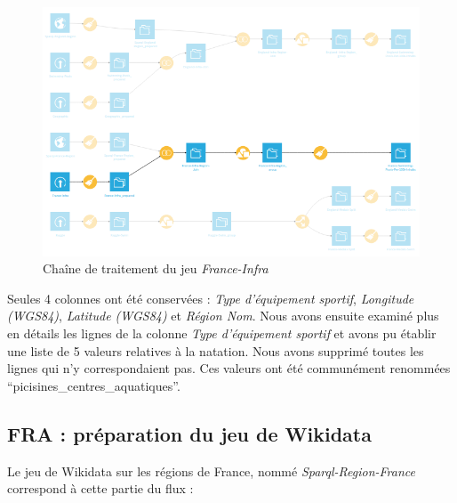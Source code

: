 \documentclass[hidelinks, 12pt]{report}
\begin{document}
\begin{center}
	\begin{figure}[H]
		\centering
		\setlength{\belowcaptionskip}{-35pt}
		\includegraphics[scale=0.5]{images/flow-swim-fra-ministere.png}
		\caption{Chaîne de traitement du jeu \textit{France-Infra}}
	\end{figure}
\end{center}

Seules 4 colonnes ont été conservées : \textit{Type d'équipement sportif}, \textit{Longitude (WGS84)}, \textit{Latitude (WGS84)} et \textit{Région Nom}. Nous avons ensuite examiné plus en détails les lignes de la colonne \textit{Type d'équipement sportif} et avons pu établir une liste de 5 valeurs relatives à la natation. Nous avons supprimé toutes les lignes qui n'y correspondaient pas. Ces valeurs ont été communément renommées \enquote{picisines\_centres\_aquatiques}.





%





\subsection{FRA : préparation du jeu de Wikidata}

Le jeu de Wikidata sur les régions de France, nommé \textit{Sparql-Region-France} correspond à cette partie du flux :
\end{document}
